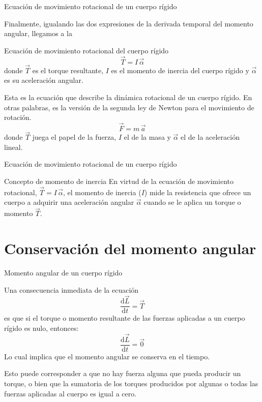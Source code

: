 \documentclass[11pt,handout,aspectratio=1610]{beamer}
\newcommand{\vs}{\vspace{11pt}}
\begin{document}
\begin{frame}{Ecuación de movimiento rotacional de un cuerpo rígido}

    Finalmente, igualando las dos expresiones de la derivada temporal del momento angular, llegamos a la 
    \begin{block}{Ecuación de movimiento rotacional del cuerpo rígido}
        $$\vec{T} = I \, \vec{\alpha}$$ donde $\vec{T}$ es el torque resultante, $I$ es el momento de inercia del cuerpo rígido y $\vec{\alpha}$ es su aceleración angular.
    \end{block} Esta es la ecuación que describe la dinámica rotacional de un cuerpo rígido. En otras palabras, es la versión de la segunda ley de Newton para el movimiento de rotación. $$\vec{F} = m \, \vec{a}$$ donde $\vec{T}$ juega el papel de la fuerza, $I$ el de la masa y $\vec{\alpha}$ el de la aceleración lineal.

\end{frame}

\begin{frame}{Ecuación de movimiento rotacional de un cuerpo rígido}

\begin{block}{Concepto de momento de inercia}
    En virtud de la ecuación de movimiento rotacional, $\vec{T} = I \, \vec{\alpha}$, el momento de inercia ($I$) mide la resistencia que ofrece un cuerpo a adquirir una aceleración angular $\vec{\alpha}$ cuando se le aplica un torque o momento $\vec{T}$.
\end{block}

\end{frame}

\section{Conservación del momento angular}

\begin{frame}{Momento angular de un cuerpo rígido}

    Una consecuencia inmediata de la ecuación $$ \frac{\text{d}\vec{L}}{\text{d}t} = \vec{T}$$ es que si el torque o momento resultante de las fuerzas aplicadas a un cuerpo rígido es nulo, entonces: $$ \frac{\text{d}\vec{L}}{\text{d}t} = \vec{0}$$ Lo cual implica que el momento angular se conserva en el tiempo. 

    \vs 

    Esto puede corresponder a que no hay fuerza alguna que pueda producir un torque, o bien que la sumatoria de los torques producidos por algunas o todas las fuerzas aplicadas al cuerpo es igual a cero.

\end{frame}
\end{document}
